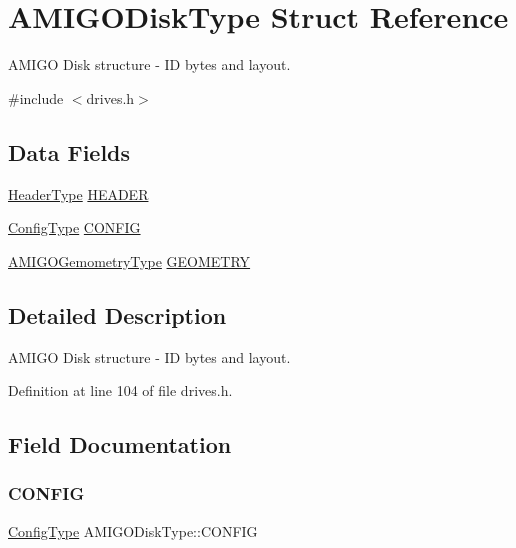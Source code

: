 \hypertarget{structAMIGODiskType}{}\section{A\+M\+I\+G\+O\+Disk\+Type Struct Reference}
\label{structAMIGODiskType}


A\+M\+I\+GO Disk structure -\/ ID bytes and layout.  




{\ttfamily \#include $<$drives.\+h$>$}

\subsection*{Data Fields}
\begin{DoxyCompactItemize}
\item 
\hyperlink{structHeaderType}{Header\+Type} \hyperlink{structAMIGODiskType_a9814efe6f564b104fc7e0100231908a8}{H\+E\+A\+D\+ER}
\item 
\hyperlink{structConfigType}{Config\+Type} \hyperlink{structAMIGODiskType_aae94c3403ceb917006591e7bd4109207}{C\+O\+N\+F\+IG}
\item 
\hyperlink{structAMIGOGemometryType}{A\+M\+I\+G\+O\+Gemometry\+Type} \hyperlink{structAMIGODiskType_aa75cfbfabf8081ff7bca08cf87af4da8}{G\+E\+O\+M\+E\+T\+RY}
\end{DoxyCompactItemize}


\subsection{Detailed Description}
A\+M\+I\+GO Disk structure -\/ ID bytes and layout. 

Definition at line 104 of file drives.\+h.



\subsection{Field Documentation}
\mbox{\label{structAMIGODiskType_aae94c3403ceb917006591e7bd4109207}} 
\subsubsection{\texorpdfstring{C\+O\+N\+F\+IG}{CONFIG}}
{\footnotesize\ttfamily \hyperlink{structConfigType}{Config\+Type} A\+M\+I\+G\+O\+Disk\+Type\+::\+C\+O\+N\+F\+IG}



